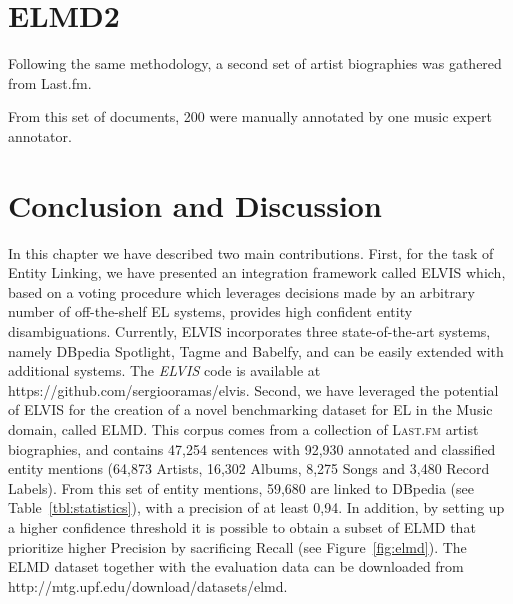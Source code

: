 \section{ELMD2}
Following the same methodology, a second set of artist biographies was gathered from Last.fm. 

From this set of documents, 200 were manually annotated by one music expert annotator. 


\section{Conclusion and Discussion}
\label{sec:elmd}

In this chapter we have described two main contributions. First, for the task of Entity Linking, we have presented an integration framework called \textsc{ELVIS} which, based on a voting procedure which leverages decisions made by an arbitrary number of off-the-shelf EL systems, provides high confident entity disambiguations. Currently, \textsc{ELVIS} incorporates three state-of-the-art systems, namely DBpedia Spotlight, Tagme and Babelfy, and can be easily extended with additional systems. The \textit{ELVIS} code is available at {\footnotesize{https://github.com/sergiooramas/elvis}}. Second, we have leveraged the potential of \textsc{ELVIS} for the creation of a novel benchmarking dataset for EL in the Music domain, called \textsc{ELMD}. This corpus comes from a collection of \textsc{Last.fm} artist biographies, and contains 47,254 sentences with 92,930 annotated and classified entity mentions (64,873 Artists, 16,302 Albums, 8,275 Songs and 3,480 Record Labels). From this set of entity mentions, 59,680 are linked to DBpedia (see Table~\ref{tbl:statistics}), with a precision of at least 0,94. In addition, by setting up a higher confidence threshold it is possible to obtain a subset of \textsc{ELMD} that prioritize higher Precision by sacrificing Recall (see Figure~\ref{fig:elmd}). The \textsc{ELMD} dataset together with the evaluation data can be downloaded from {\footnotesize{http://mtg.upf.edu/download/datasets/elmd}}.
